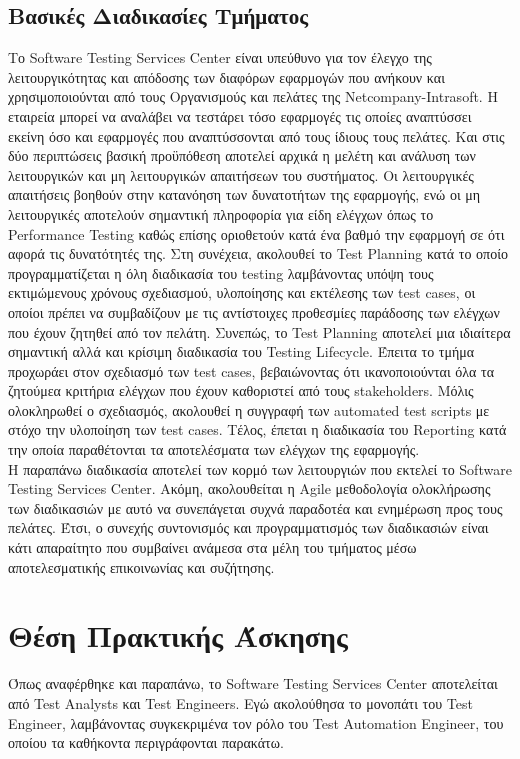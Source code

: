 \subsection*{Βασικές Διαδικασίες Τμήματος}
Το Software Testing Services Center είναι υπεύθυνο για τον έλεγχο της λειτουργικότητας και απόδοσης των διαφόρων εφαρμογών που ανήκουν και χρησιμοποιούνται από τους 
Οργανισμούς και πελάτες της Netcompany-Intrasoft. Η εταιρεία μπορεί να αναλάβει να τεστάρει τόσο εφαρμογές τις οποίες αναπτύσσει εκείνη όσο και εφαρμογές που αναπτύσσονται 
από τους ίδιους τους πελάτες. Και στις δύο περιπτώσεις βασική προϋπόθεση αποτελεί αρχικά η μελέτη και ανάλυση των λειτουργικών και μη λειτουργικών απαιτήσεων του συστήματος. 
Οι λειτουργικές απαιτήσεις βοηθούν στην κατανόηση των δυνατοτήτων της εφαρμογής, ενώ οι μη λειτουργικές αποτελούν σημαντική πληροφορία για είδη ελέγχων όπως το Performance Testing 
καθώς επίσης οριοθετούν κατά ένα βαθμό την εφαρμογή σε ότι αφορά τις δυνατότητές της. Στη συνέχεια, ακολουθεί το Test Planning κατά το οποίο προγραμματίζεται η όλη διαδικασία του 
testing λαμβάνοντας υπόψη τους εκτιμώμενους χρόνους σχεδιασμού, υλοποίησης και εκτέλεσης των test cases, οι οποίοι πρέπει να συμβαδίζουν με τις αντίστοιχες προθεσμίες παράδοσης 
των ελέγχων που έχουν ζητηθεί από τον πελάτη. Συνεπώς, το Test Planning αποτελεί μια ιδιαίτερα σημαντική αλλά και κρίσιμη διαδικασία του Testing Lifecycle. Έπειτα το τμήμα προχωράει 
στον σχεδιασμό των test cases, βεβαιώνοντας ότι ικανοποιούνται όλα τα ζητούμεα κριτήρια ελέγχων που έχουν καθοριστεί από τους stakeholders. Μόλις ολοκληρωθεί ο σχεδιασμός, ακολουθεί η 
συγγραφή των automated test scripts με στόχο την υλοποίηση των test cases. Τέλος, έπεται η διαδικασία του Reporting κατά την οποία παραθέτονται τα αποτελέσματα των ελέγχων της εφαρμογής.\\

Η παραπάνω διαδικασία αποτελεί των κορμό των λειτουργιών που εκτελεί το Software Testing Services Center. Ακόμη, ακολουθείται η Agile μεθοδολογία ολοκλήρωσης των διαδικασιών με αυτό να 
συνεπάγεται συχνά παραδοτέα και ενημέρωση προς τους πελάτες. Έτσι, ο συνεχής συντονισμός και προγραμματισμός των διαδικασιών είναι κάτι απαραίτητο που συμβαίνει ανάμεσα στα μέλη του τμήματος 
μέσω αποτελεσματικής επικοινωνίας και συζήτησης.

\section*{Θέση Πρακτικής Άσκησης}
Όπως αναφέρθηκε και παραπάνω, το Software Testing Services Center αποτελείται από Test Analysts και Test Engineers. Εγώ ακολούθησα το μονοπάτι του Test Engineer, λαμβάνοντας συγκεκριμένα τον ρόλο του Test Automation Engineer, του οποίου τα καθήκοντα περιγράφονται παρακάτω.\\

